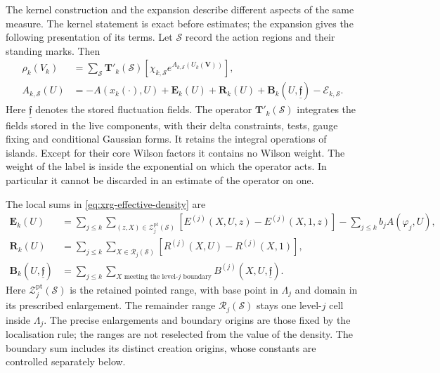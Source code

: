 \documentclass[11pt,letterpaper,reqno]{amsart}
\theoremstyle{definition}
\theoremstyle{remark}
\begin{document}
The kernel construction and the expansion describe
different aspects of the same measure. The kernel
statement is exact before estimates; the expansion
gives the following presentation of its terms.
Let $\mathcal S$ record the action regions and
their standing marks. Then
\begin{equation}\label{eq:xrg-effective-density}
 \begin{split}
 \rho_k(V_k)
 &=\sum_{\mathcal S}\mathbf T'_k(\mathcal S)
       \left[\chi_{k,\mathcal S}
           e^{A_{k,\mathcal S}(U_k(\mathbf V))}\right],\\
 A_{k,\mathcal S}(U)
 &=-A(x_k(\cdot),U)+\mathbf E_k(U)
       +\mathbf R_k(U)+\mathbf B_k(U,\underline{\mathfrak f})
        -\mathcal E_{k,\mathcal S}.
 \end{split}
\end{equation}
Here $\underline{\mathfrak f}$ denotes the stored fluctuation fields.
The operator $\mathbf T'_k(\mathcal S)$
integrates the fields stored in the live
components, with their delta constraints,
tests, gauge fixing and conditional Gaussian
forms. It retains the integral operations of
islands. Except for their core Wilson factors
it contains no Wilson weight. The weight of
the label is inside the exponential on which
the operator acts. In particular it cannot
be discarded in an estimate of the operator
on one.

The local sums in
\eqref{eq:xrg-effective-density} are
\begin{equation}\label{eq:xrg-effective-sums}
 \begin{split}
 \mathbf E_k(U)
  &=\sum_{j\le k}\sum_{(z,X)\in\mathcal Z_j^{\mathrm{pt}}(\mathcal S)}
       [E^{(j)}(X,U,z)-E^{(j)}(X,1,z)]
                           -\sum_{j\le k}b_jA(\varphi_j,U),\\
 \mathbf R_k(U)
 &=\sum_{j\le k}\sum_{X\in\mathcal R_j(\mathcal S)}
                       [R^{(j)}(X,U)-R^{(j)}(X,1)],\\
 \mathbf B_k(U,\underline{\mathfrak f})
 &=\sum_{j\le k}\sum_{X\text{ meeting the level-}j\text{ boundary}}
                       B^{(j)}(X,U,\underline{\mathfrak f}).
 \end{split}
\end{equation}
Here $\mathcal Z_j^{\mathrm{pt}}(\mathcal S)$ is the
retained pointed range, with base point in
$\Lambda_j$ and domain in its prescribed
enlargement. The remainder range
$\mathcal R_j(\mathcal S)$ stays one
level-$j$ cell inside $\Lambda_j$.
The precise enlargements and boundary
origins are those fixed by the localisation
rule; the ranges are not reselected from
the value of the density. The boundary
sum includes its distinct creation
origins, whose constants are controlled
separately below.
\end{document}
